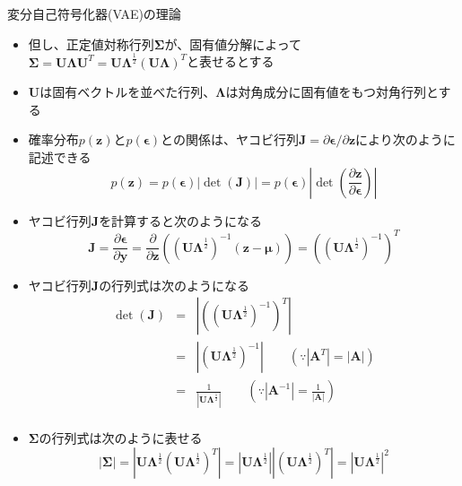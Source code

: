 \documentclass[dvipdfmx,notheorems,t]{beamer}
\begin{document}
\begin{frame}{変分自己符号化器(VAE)の理論}
\begin{itemize}
\begin{itemize}
		\item 但し、正定値対称行列$\bm{\Sigma}$が、固有値分解によって$\bm{\Sigma} = \bm{U} \bm{\Lambda} \bm{U}^T = \bm{U} \bm{\Lambda}^\frac{1}{2} \left( \bm{U} \bm{\Lambda} \right)^T$と表せるとする
		\item $\bm{U}$は固有ベクトルを並べた行列、$\bm{\Lambda}$は対角成分に固有値をもつ対角行列とする
		\newline
		
		\item 確率分布$p(\bm{z})$と$p(\bm{\epsilon})$との関係は、ヤコビ行列$\bm{J} = \partial \bm{\epsilon} / \partial \bm{z}$により次のように記述できる
		\begin{equation}
			p(\bm{z}) = p(\bm{\epsilon}) | \det \left( \bm{J} \right) | = p(\bm{\epsilon}) \left| \det \left( \frac{\partial \bm{z}}{\partial \bm{\epsilon}} \right) \right|
		\end{equation}
		
		\item ヤコビ行列$\bm{J}$を計算すると次のようになる
		\begin{equation}
			\bm{J} = \frac{\partial \bm{\epsilon}}{\partial \bm{y}} = \frac{\partial}{\partial \bm{z}} \left( \left( \bm{U} \bm{\Lambda}^\frac{1}{2} \right)^{-1} \left( \bm{z} - \bm{\mu} \right) \right) = \left( \left( \bm{U} \bm{\Lambda}^\frac{1}{2} \right)^{-1} \right)^T
		\end{equation}
		
		\item ヤコビ行列$\bm{J}$の行列式は次のようになる
		\begin{eqnarray}
			\det \left( \bm{J} \right) &=& \left| \left( \left( \bm{U} \bm{\Lambda}^\frac{1}{2} \right)^{-1} \right)^T \right| \nonumber \\
			&=& \left| \left( \bm{U} \bm{\Lambda}^\frac{1}{2} \right)^{-1} \right| \qquad (\because |\bm{A}^T| = |\bm{A}|) \nonumber \\
			&=& \frac{1}{\left| \bm{U} \bm{\Lambda}^\frac{1}{2} \right|} \qquad \left( \because |\bm{A}^{-1}| = \frac{1}{|\bm{A}|} \right) \nonumber \\
		\end{eqnarray}
		
		\item $\bm{\Sigma}$の行列式は次のように表せる
		\begin{equation}
			| \bm{\Sigma} | = \left| \bm{U} \bm{\Lambda}^\frac{1}{2} \left( \bm{U} \bm{\Lambda}^\frac{1}{2} \right)^T \right| = \left| \bm{U} \bm{\Lambda}^\frac{1}{2} \right| \left| \left( \bm{U} \bm{\Lambda}^\frac{1}{2} \right)^T \right| = \left| \bm{U} \bm{\Lambda}^\frac{1}{2} \right|^2
		\end{equation}
		

\end{itemize}
\end{itemize}
\end{frame}
\end{document}

